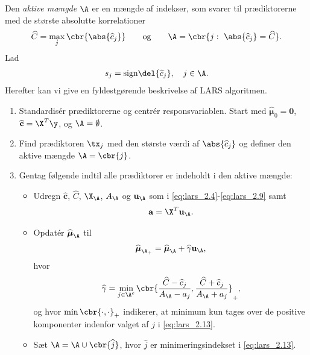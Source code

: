 Den \textit{aktive mængde} \(\A\) er en mængde af indekser, som svarer til prædiktorerne med de største absolutte korrelationer
\begin{align}
\widehat{C} = \max_j \cbr{\abs{\widehat{c}_j}}  \qquad \text{og} \qquad \A= \cbr{j: \ \abs{ \widehat{c}_j} = \widehat{C}}. \label{eq:lars_2.9}
\end{align}
Lad 
\begin{align}
s_j = \text{sign} \del{\widehat{c}_j}, \quad j \in \A. \label{eq:lars_2.10}
\end{align}
%
Herefter kan vi give en fyldestgørende beskrivelse af LARS algoritmen.
%
\begin{alg} 
\begin{enumerate}
\item Standardisér prædiktorerne og centrér responsvariablen. 
Start med \(\widehat{\boldsymbol{\mu}}_0 = \mathbf{0}\), \(\widehat{\mathbf{c}} = \X^T \y\), og \(\A = \emptyset\).
\item Find prædiktoren \(\tx_j\) med den største værdi af \(\abs{\widehat{c}_j}\) og definer den aktive mængde \(\A = \cbr{j}\).
\item 
Gentag følgende indtil alle prædiktorer er indeholdt i den aktive mængde:
\begin{itemize}
\item Udregn \(\widehat{\mathbf{c}}\), \(\widehat{C}\), \(\X_\A\), \(A_\A\) og \(\mathbf{u}_\A\) som i \eqref{eq:lars_2.4}-\ref{eq:lars_2.9} samt
\begin{align*}
\mathbf{a} = \X^T \mathbf{u}_\A.
\end{align*}
\item Opdatér \(\widehat{\boldsymbol{\mu}}_\A\) til
\begin{align}
\widehat{\boldsymbol{\mu}}_{\A_+} = \widehat{\boldsymbol{\mu}}_\A + \widehat{\gamma} \mathbf{u}_\A, \label{eq:lars_2.12}
\end{align}
hvor 
\begin{align}
\widehat{\gamma} = \min_{j \in \A^c} \cbr{ \frac{\widehat{C}- \widehat{c}_j}{A_\A - a_j} , \frac{\widehat{C} + \widehat{c}_j}{A_\A + a_j}}_+, \label{eq:lars_2.13}
\end{align}
og hvor \(\min \cbr{\cdot , \cdot}_+\) indikerer, at minimum kun tages over de positive komponenter indenfor valget af \(j\) i \eqref{eq:lars_2.13}.
\item Sæt \(\A = \A \cup \cbr{\widehat{j}}\), hvor \(\widehat{j}\) er minimeringsindekset i \eqref{eq:lars_2.13}.
\end{itemize}
\end{enumerate}
\end{alg}
